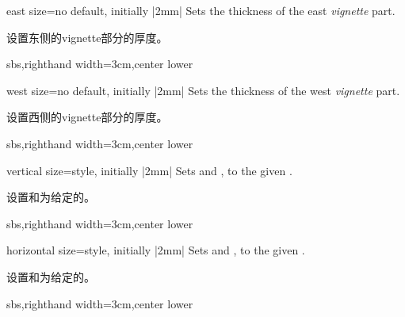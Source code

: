 \begin{vigTcbKey}[][doc new=2016-04-22]{east size}{=}{no default, initially |2mm|}
Sets the thickness of the east \emph{vignette} part.

设置东侧的vignette部分的厚度。
\begin{dispExample*}{sbs,righthand width=3cm,center lower}
\end{dispExample*}
\end{vigTcbKey}

\begin{vigTcbKey}[][doc new=2016-04-22]{west size}{=}{no default, initially |2mm|}
Sets the thickness of the west \emph{vignette} part.

设置西侧的vignette部分的厚度。
\begin{dispExample*}{sbs,righthand width=3cm,center lower}
\end{dispExample*}
\end{vigTcbKey}


\begin{vigTcbKey}[][doc new=2016-04-22]{vertical size}{=}{style, initially |2mm|}
Sets  and ,
to the given .

设置和为给定的。
\begin{dispExample*}{sbs,righthand width=3cm,center lower}
\end{dispExample*}
\end{vigTcbKey}

\begin{vigTcbKey}[][doc new=2016-04-22]{horizontal size}{=}{style, initially |2mm|}
Sets  and ,
to the given .

设置和为给定的。
\begin{dispExample*}{sbs,righthand width=3cm,center lower}
\end{dispExample*}
\end{vigTcbKey}


